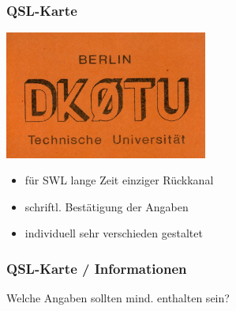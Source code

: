 \begin{frame}
    \frametitle{QSL-Karte}

    \begin{center}
        \includegraphics[width=0.5\textwidth]{bv13/DK0TU_0.jpg}
    \end{center}

    \begin{itemize}
        \item für SWL lange Zeit einziger Rückkanal
        \item schriftl. Bestätigung der Angaben
        \item individuell sehr verschieden gestaltet
    \end{itemize}

\end{frame}

\begin{frame}
    \frametitle{QSL-Karte / Informationen}

    \begin{block}{Welche Angaben sollten mind. enthalten sein?}
    \end{block}


\end{frame}

